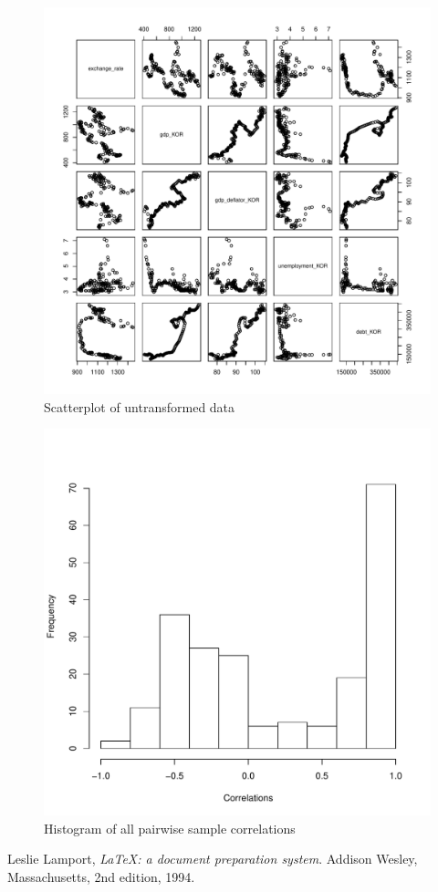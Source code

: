 \documentclass[12pt]{article}
\begin{document}
\begin{figure}
  \centering
    \includegraphics{scatterplot.pdf}
  \caption{Scatterplot of untransformed data}
  \label{fig:scatterplot}
\end{figure}

\begin{figure}
  \centering
    \includegraphics{correlation.pdf}
  \caption{Histogram of all pairwise sample correlations}
  \label{fig:correlation}
\end{figure}


\newpage

\begin{thebibliography}{9}

  Leslie Lamport,
  \emph{\LaTeX: a document preparation system}.
  Addison Wesley, Massachusetts,
  2nd edition,
  1994.

\end{thebibliography}
\end{document}
